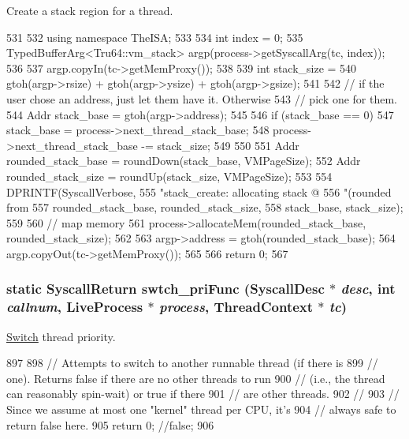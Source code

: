 Create a stack region for a thread. 


\begin{DoxyCode}
531     {
532         using namespace TheISA;
533 
534         int index = 0;
535         TypedBufferArg<Tru64::vm_stack> argp(process->getSyscallArg(tc, index));
536 
537         argp.copyIn(tc->getMemProxy());
538 
539         int stack_size =
540             gtoh(argp->rsize) + gtoh(argp->ysize) + gtoh(argp->gsize);
541 
542         // if the user chose an address, just let them have it.  Otherwise
543         // pick one for them.
544         Addr stack_base = gtoh(argp->address);
545 
546         if (stack_base == 0) {
547             stack_base = process->next_thread_stack_base;
548             process->next_thread_stack_base -= stack_size;
549         }
550 
551         Addr rounded_stack_base = roundDown(stack_base, VMPageSize);
552         Addr rounded_stack_size = roundUp(stack_size, VMPageSize);
553 
554         DPRINTF(SyscallVerbose,
555                 "stack_create: allocating stack @ %
556                 "(rounded from %
557                 rounded_stack_base, rounded_stack_size,
558                 stack_base, stack_size);
559 
560         // map memory
561         process->allocateMem(rounded_stack_base, rounded_stack_size);
562 
563         argp->address = gtoh(rounded_stack_base);
564         argp.copyOut(tc->getMemProxy());
565 
566         return 0;
567     }
\end{DoxyCode}
\hypertarget{classTru64_a447627b7d2862dbc933f4d4a4433cd4c}{
\subsubsection[{swtch\_\-priFunc}]{\setlength{\rightskip}{0pt plus 5cm}static {\bf SyscallReturn} swtch\_\-priFunc ({\bf SyscallDesc} $\ast$ {\em desc}, \/  int {\em callnum}, \/  {\bf LiveProcess} $\ast$ {\em process}, \/  {\bf ThreadContext} $\ast$ {\em tc})}}
\label{classTru64_a447627b7d2862dbc933f4d4a4433cd4c}


\hyperlink{classSwitch}{Switch} thread priority. 


\begin{DoxyCode}
897     {
898         // Attempts to switch to another runnable thread (if there is
899         // one).  Returns false if there are no other threads to run
900         // (i.e., the thread can reasonably spin-wait) or true if there
901         // are other threads.
902         //
903         // Since we assume at most one "kernel" thread per CPU, it's
904         // always safe to return false here.
905         return 0; //false;
906     }
\end{DoxyCode}



